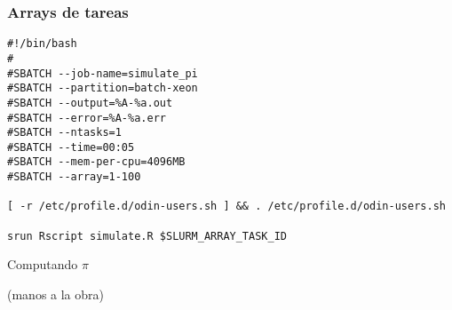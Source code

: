 \documentclass[handout]{beamer}
\begin{document}
\begin{frame}[fragile]
\frametitle{Arrays de tareas}
\begin{verbatim}
#!/bin/bash
#
#SBATCH --job-name=simulate_pi
#SBATCH --partition=batch-xeon
#SBATCH --output=%A-%a.out
#SBATCH --error=%A-%a.err
#SBATCH --ntasks=1
#SBATCH --time=00:05
#SBATCH --mem-per-cpu=4096MB
#SBATCH --array=1-100

[ -r /etc/profile.d/odin-users.sh ] && . /etc/profile.d/odin-users.sh

srun Rscript simulate.R $SLURM_ARRAY_TASK_ID
\end{verbatim}
\end{frame}


\begin{frame}
\begin{center}
{\huge{Computando $\pi$}}

(manos a la obra)
\end{center}

\end{frame}
\end{document}
